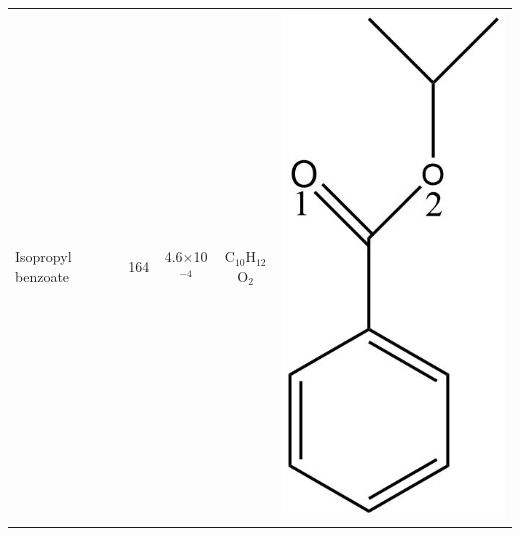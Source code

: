 \begin{table}
\begin{tabular}{lcccc}
\midrule
Isopropyl benzoate &   164 &4.6$\times$10$^{-4}$&   C$_{10}$H$_{12}$O$_2$ & \begin{minipage}[c]{0.105\linewidth}\centering \includegraphics[width=\linewidth]{pics/cocaine-chapter/iPrBz_struct.png}\end{minipage}\\ 

\end{tabular}
\end{table}
